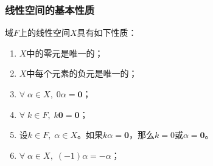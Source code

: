 \subsubsection{线性空间的基本性质}
\begin{property}\label{prop:LinearSpace}
	域$F$上的线性空间$X$具有如下性质：
	\begin{enumerate}
		\item $X$中的零元是唯一的；
		\item $X$中每个元素的负元是唯一的；
		\item $\forall\;\alpha\in X,\;0\alpha=\mathbf{0}$；
		\item $\forall\;k\in F,\;k\mathbf{0}=\mathbf{0}$；
		\item 设$k\in F,\;\alpha\in X$。如果$k\alpha=\mathbf{0}$，那么$k=0$或$\alpha=\mathbf{0}$。
		\item $\forall\;\alpha\in X,\;(-1)\alpha=-\alpha$；
	\end{enumerate}
\end{property}
